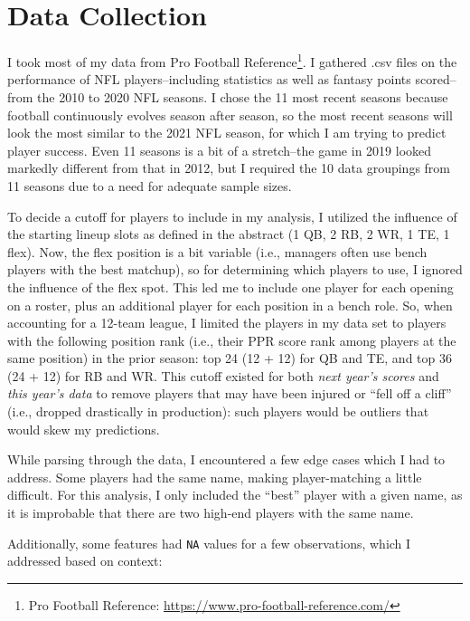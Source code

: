 \documentclass[
]{article}
\begin{document}
\hypertarget{data-collection}{%
\section{Data Collection}\label{data-collection}}

I took most of my data from Pro Football Reference\footnote{Pro Football
  Reference: \url{https://www.pro-football-reference.com/}}. I gathered
.csv files on the performance of NFL players--including statistics as
well as fantasy points scored--from the 2010 to 2020 NFL seasons. I
chose the 11 most recent seasons because football continuously evolves
season after season, so the most recent seasons will look the most
similar to the 2021 NFL season, for which I am trying to predict player
success. Even 11 seasons is a bit of a stretch--the game in 2019 looked
markedly different from that in 2012, but I required the 10 data
groupings from 11 seasons due to a need for adequate sample sizes.

To decide a cutoff for players to include in my analysis, I utilized the
influence of the starting lineup slots as defined in the abstract (1 QB,
2 RB, 2 WR, 1 TE, 1 flex). Now, the flex position is a bit variable
(i.e., managers often use bench players with the best matchup), so for
determining which players to use, I ignored the influence of the flex
spot. This led me to include one player for each opening on a roster,
plus an additional player for each position in a bench role. So, when
accounting for a 12-team league, I limited the players in my data set to
players with the following position rank (i.e., their PPR score rank
among players at the same position) in the prior season: top 24 (12 +
12) for QB and TE, and top 36 (24 + 12) for RB and WR. This cutoff
existed for both \emph{next year's scores} and \emph{this year's data}
to remove players that may have been injured or ``fell off a cliff''
(i.e., dropped drastically in production): such players would be
outliers that would skew my predictions.

While parsing through the data, I encountered a few edge cases which I
had to address. Some players had the same name, making player-matching a
little difficult. For this analysis, I only included the ``best'' player
with a given name, as it is improbable that there are two high-end
players with the same name.

Additionally, some features had \texttt{NA} values for a few
observations, which I addressed based on context:
\end{document}
